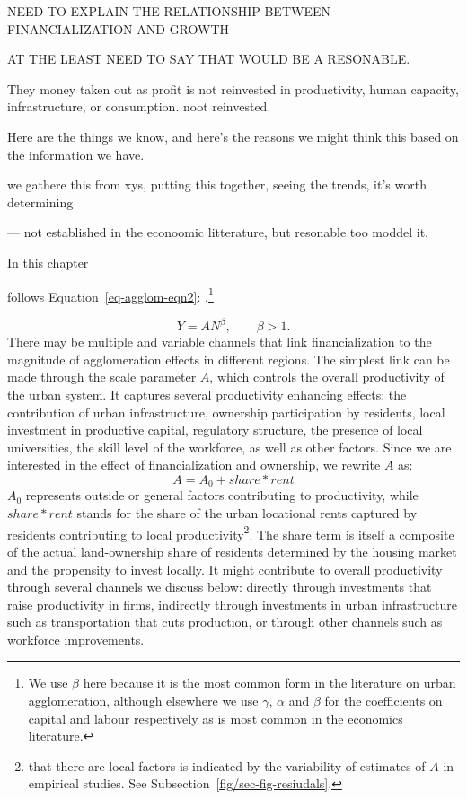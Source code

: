 NEED TO EXPLAIN THE  RELATIONSHIP BETWEEN FINANCIALIZATION AND GROWTH

AT THE LEAST NEED TO SAY THAT WOULD BE A RESONABLE.

They money taken out as profit is not reinvested in productivity, human capacity, infrastructure, or consumption. noot reinvested.

Here are the things we know, and here's the reasons we might think this based on the information we have.

we gathere this from xys, putting this together, seeing the trends, it's worth determining

--- not established in the econoomic litterature, but resonable too moddel it.

In this chapter


follows Equation~\ref{eq-agglom-eqn2}: \cite{loboUrbanScalingProduction2013}.\footnote{We use $\beta$ here because it is the most common form in the literature on urban agglomeration, although elsewhere we use $\gamma$, $\alpha$ and $\beta$ for the coefficients on capital and labour respectively as is most common in the economics literature.}

\begin{equation}\label{eq-agglom-eqn2}
    Y=AN^\beta,\qquad \beta>1. 
\end{equation}
There may be multiple and variable channels that link financialization to the magnitude of agglomeration effects in different regions. 
The simplest link can be made through the scale parameter $A$, which controls the overall productivity of the urban system. It captures several productivity enhancing effects: the contribution of urban infrastructure, ownership participation by residents, local investment in productive capital, regulatory structure, the presence of local universities, the skill level of the workforce, as well as other factors. 
Since we are interested in the effect of financialization and ownership, we rewrite $A$ as:
\[ A= A_0 + share * rent\]
$A_0$ represents outside or general factors contributing to productivity, while $share*rent$ stands for the share of the urban locational rents captured by residents contributing to local productivity\footnote{that there are local factors is indicated by the variability of estimates of $A$ in empirical studies. See Subsection~\ref{fig/sec-fig-resiudals}.}. The share term is itself a composite of the actual land-ownership share of residents determined by the housing market and the propensity to invest locally.  It might contribute to overall productivity through several channels we discuss below:  directly through investments that raise productivity in firms, indirectly through investments in urban infrastructure such as transportation that cuts production, or through other channels such as workforce improvements. 


